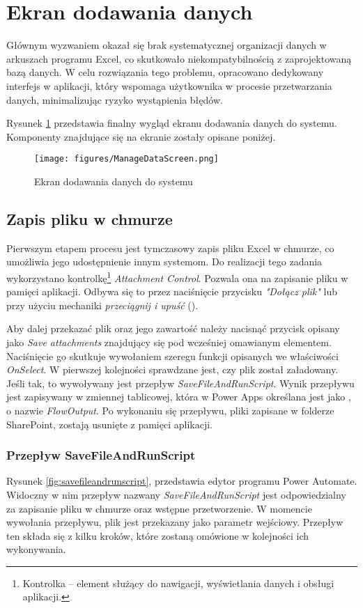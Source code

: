 \section{Ekran dodawania danych}
Głównym wyzwaniem okazał się brak systematycznej organizacji danych w arkuszach programu
Excel, co skutkowało niekompatybilnością z zaprojektowaną bazą danych. W celu rozwiązania tego
problemu, opracowano dedykowany interfejs w aplikacji, który wspomaga użytkownika w procesie
przetwarzania danych, minimalizując ryzyko wystąpienia błędów. 

\noindent Rysunek \ref{fig:managedatascreen} przedstawia finalny wygląd ekranu dodawania danych do systemu. Komponenty znajdujące się na ekranie zostały opisane poniżej.
\begin{figure}[H]
    \centering
    \texttt{[image: figures/ManageDataScreen.png]}
    \caption{Ekran dodawania danych do systemu} 
    \label{fig:managedatascreen}
\end{figure}

\subsection{Zapis pliku w chmurze}
Pierwszym etapem procesu jest tymczasowy zapis pliku Excel w chmurze, co umożliwia jego udostępnienie innym systemom. Do realizacji tego zadania wykorzystano kontrolkę\footnote{Kontrolka -- element służący do nawigacji, wyświetlania danych i obsługi aplikacji.} \emph{Attachment Control}. Pozwala ona na zapisanie pliku w pamięci aplikacji. Odbywa się to przez naciśnięcie przycisku \emph{"Dołącz plik"} lub przy użyciu mechaniki \emph{przeciągnij i upuść} (). 

Aby dalej przekazać plik oraz jego zawartość należy nacisnąć przycisk opisany jako \emph{Save attachments} znajdujący się pod wcześniej omawianym elementem. Naciśnięcie go skutkuje wywołaniem szeregu funkcji opisanych we właściwości \emph{OnSelect}. W pierwszej kolejności sprawdzane jest, czy plik został załadowany. Jeśli tak, to wywoływany jest przepływ \emph{SaveFileAndRunScript}. Wynik przepływu jest zapisywany w zmiennej tablicowej, która w Power Apps określana jest jako , o nazwie \emph{FlowOutput}. Po wykonaniu się przepływu, pliki zapisane w folderze SharePoint, zostają usunięte z pamięci aplikacji.



\subsubsection{Przepływ SaveFileAndRunScript}
Rysunek \ref{fig:savefileandrunscript}, przedstawia edytor programu Power Automate. Widoczny w nim przepływ nazwany \emph{SaveFileAndRunScript} jest odpowiedzialny za zapisanie pliku w chmurze oraz wstępne przetworzenie. W momencie wywołania przepływu, plik jest przekazany jako parametr wejściowy. Przepływ ten składa się z kilku kroków, które zostaną omówione w kolejności ich wykonywania.

